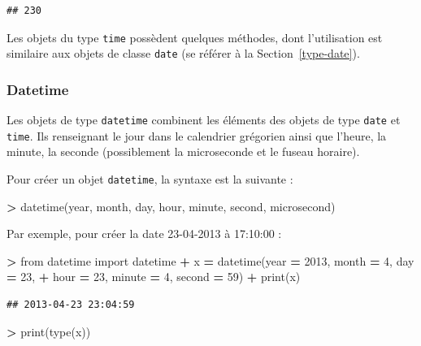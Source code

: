 \documentclass[12pt,]{book}
\newenvironment{Shaded}{\begin{snugshade}}{\end{snugshade}}
\newcommand{\DecValTok}[1]{\textcolor[rgb]{0.00,0.00,0.81}{#1}}
\newcommand{\ImportTok}[1]{#1}
\newcommand{\OperatorTok}[1]{\textcolor[rgb]{0.81,0.36,0.00}{\textbf{#1}}}
\newcommand{\BuiltInTok}[1]{#1}
\newcommand{\NormalTok}[1]{#1}
\numberwithin{equation}{section}
\numberwithin{countremarque}{section}
\begin{document}
\begin{lstlisting}
## 230
\end{lstlisting}

Les objets du type \texttt{time} possèdent quelques méthodes, dont
l'utilisation est similaire aux objets de classe \texttt{date} (se
référer à la Section~\ref{type-date}).

\subsubsection{Datetime}\label{datetime}

Les objets de type \texttt{datetime} combinent les éléments des objets
de type \texttt{date} et \texttt{time}. Ils renseignant le jour dans le
calendrier grégorien ainsi que l'heure, la minute, la seconde
(possiblement la microseconde et le fuseau horaire).

Pour créer un objet \texttt{datetime}, la syntaxe est la suivante :

\begin{Shaded}
\begin{Highlighting}[]
\OperatorTok{>}\NormalTok{ datetime(year, month, day, hour, minute, second, microsecond)}
\end{Highlighting}
\end{Shaded}

Par exemple, pour créer la date 23-04-2013 à 17:10:00 :

\begin{Shaded}
\begin{Highlighting}[]
\OperatorTok{>} \ImportTok{from}\NormalTok{ datetime }\ImportTok{import}\NormalTok{ datetime}
\OperatorTok{+}\NormalTok{ x }\OperatorTok{=}\NormalTok{ datetime(year }\OperatorTok{=} \DecValTok{2013}\NormalTok{, month }\OperatorTok{=} \DecValTok{4}\NormalTok{, day }\OperatorTok{=} \DecValTok{23}\NormalTok{,}
\OperatorTok{+}\NormalTok{   hour }\OperatorTok{=} \DecValTok{23}\NormalTok{, minute }\OperatorTok{=} \DecValTok{4}\NormalTok{, second }\OperatorTok{=} \DecValTok{59}\NormalTok{)}
\OperatorTok{+} \BuiltInTok{print}\NormalTok{(x)}
\end{Highlighting}
\end{Shaded}

\begin{lstlisting}
## 2013-04-23 23:04:59
\end{lstlisting}

\begin{Shaded}
\begin{Highlighting}[]
\OperatorTok{>} \BuiltInTok{print}\NormalTok{(}\BuiltInTok{type}\NormalTok{(x))}
\end{Highlighting}
\end{Shaded}
\end{document}
